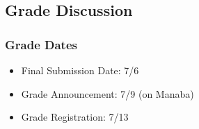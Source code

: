 \subsection{Grade Discussion}

\begin{frame}
  \frametitle{Grade Dates}

  \begin{itemize}
  \item Final Submission Date: 7/6
    \bigskip

  \item Grade Announcement: 7/9 (on Manaba)
    \bigskip

  \item Grade Registration: 7/13
  \end{itemize}  
\end{frame}


